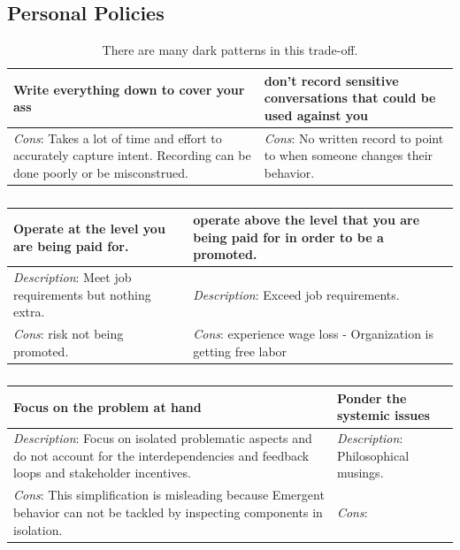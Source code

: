 \subsection{Personal Policies}

\begin{center}
\begin{table}[ht]
\begin{tabular}{ | m{\dilemmatablewidth}| m{\dilemmatablewidth} | } 
  \hline
  \textbf{Write everything down to cover your ass} &
  \textbf{don't record sensitive conversations that could be used against you} \\
  \hline
  \textit{Cons}: Takes a lot of time and effort to accurately capture intent. Recording can be done poorly or be misconstrued.  & 
  \textit{Cons}: No written record to point to when someone changes their behavior. \\
  \hline
\end{tabular}
\caption{There are many dark patterns in this trade-off.}
\label{table:notes_or_no_notes}
\end{table}
\end{center}


\begin{center}
\begin{table}[ht]
\begin{tabular}{ | m{\dilemmatablewidth}| m{\dilemmatablewidth} | } 
  \hline
  \textbf{Operate at the level you are being paid for.} &
  \textbf{operate above the level that you are being paid for in order to be a promoted.} \\
  \hline
  \textit{Description}: Meet job requirements but nothing extra. &
  \textit{Description}: Exceed job requirements. \\
  \hline
  \textit{Cons}: risk not being promoted. & 
  \textit{Cons}: experience wage loss - Organization is getting free labor \\
  \hline
\end{tabular}
\caption{
}
\label{table:work_extra_or_work_as_expected}
\end{table}
\end{center}

\begin{center}
\begin{table}[ht]
\begin{tabular}{ | m{\dilemmatablewidth}| m{\dilemmatablewidth} | } 
  \hline
  \textbf{Focus on the problem at hand} &
  \textbf{Ponder the systemic issues} \\
  \hline
  \textit{Description}: Focus on isolated problematic aspects and do not account for the interdependencies and feedback loops and stakeholder incentives. &
  \textit{Description}: Philosophical musings. \\
  \hline
  \textit{Cons}: This simplification is misleading because Emergent behavior can not be tackled by inspecting components in isolation. & 
  \textit{Cons}: \\
  \hline
\end{tabular}
\caption{
}
\label{table:focus-vs-systemic}
\end{table}
\end{center}

